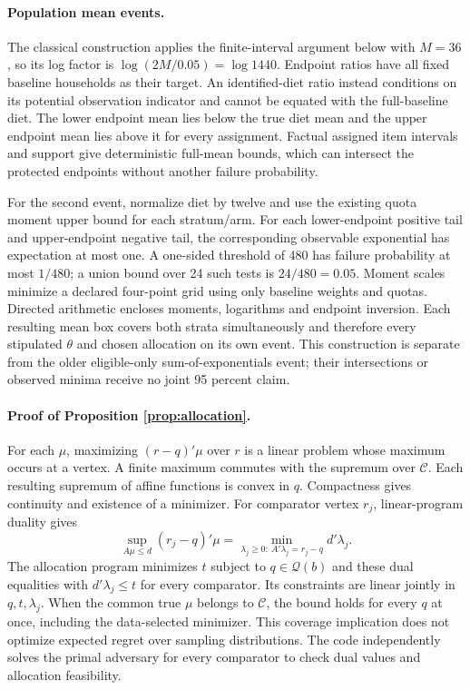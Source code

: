 \documentclass[11pt]{article}
\begin{document}
\paragraph{Population mean events.}
The classical construction applies the finite-interval argument below with $M=36$, so its log factor is $\log(2M/0.05)=\log1440$. Endpoint ratios have all fixed baseline households as their target. An identified-diet ratio instead conditions on its potential observation indicator and cannot be equated with the full-baseline diet. The lower endpoint mean lies below the true diet mean and the upper endpoint mean lies above it for every assignment. Factual assigned item intervals and support give deterministic full-mean bounds, which can intersect the protected endpoints without another failure probability.

For the second event, normalize diet by twelve and use the existing quota moment upper bound for each stratum/arm. For each lower-endpoint positive tail and upper-endpoint negative tail, the corresponding observable exponential has expectation at most one. A one-sided threshold of 480 has failure probability at most $1/480$; a union bound over 24 such tests is $24/480=0.05$. Moment scales minimize a declared four-point grid using only baseline weights and quotas. Directed arithmetic encloses moments, logarithms and endpoint inversion. Each resulting mean box covers both strata simultaneously and therefore every stipulated $\theta$ and chosen allocation on its own event. This construction is separate from the older eligible-only sum-of-exponentials event; their intersections or observed minima receive no joint 95 percent claim.

\paragraph{Proof of Proposition \ref{prop:allocation}.}
For each $\mu$, maximizing $(r-q)'\mu$ over $r$ is a linear problem whose maximum occurs at a vertex. A finite maximum commutes with the supremum over $\mathcal C$. Each resulting supremum of affine functions is convex in $q$. Compactness gives continuity and existence of a minimizer. For comparator vertex $r_j$, linear-program duality gives
\[
 \sup_{A\mu\leq d}(r_j-q)'\mu
 =\min_{\lambda_j\geq0:\ A'\lambda_j=r_j-q}d'\lambda_j.
\]
The allocation program minimizes $t$ subject to $q\in\mathcal Q(b)$ and these dual equalities with $d'\lambda_j\leq t$ for every comparator. Its constraints are linear jointly in $q,t,\lambda_j$. When the common true $\mu$ belongs to $\mathcal C$, the bound holds for every $q$ at once, including the data-selected minimizer. This coverage implication does not optimize expected regret over sampling distributions. The code independently solves the primal adversary for every comparator to check dual values and allocation feasibility.
\end{document}
